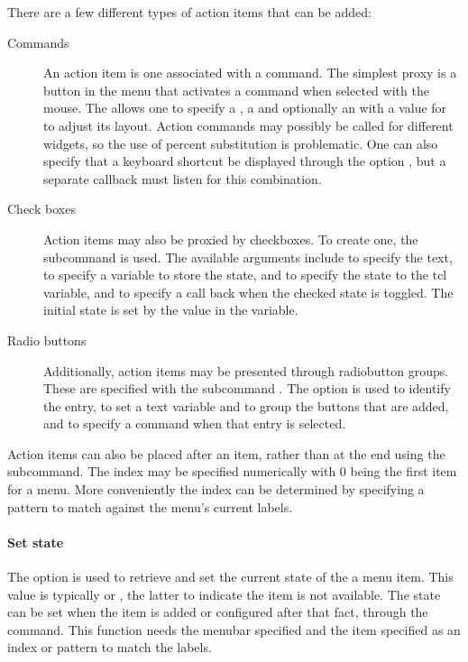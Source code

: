 There are a few different types of action items that can be added:
 
\begin{description}
\item[Commands] An action item is one associated with a command. The
  simplest proxy is a button in the menu that activates a command when
  selected with the mouse. The  allows
  one to specify a , a  and optionally an
   with a value for  to adjust its
  layout. Action commands may %
  possibly be called for different widgets, so the use of percent
  substitution is problematic. One can also specify that a keyboard
  shortcut be displayed through the option , but
  a separate callback must listen for this combination.

\item[Check boxes] Action items may also be proxied by checkboxes. To
  create one, the subcommand  is
  used. The available arguments include  to specify the
  text,  to specify a \TCL{} variable to store the state,
   and  to specify the state to the tcl
  variable, and  to specify a call back when the checked
  state is toggled. The initial state is set by the value in the
  \TCL\/ variable.

\item[Radio buttons] Additionally, action items may be presented
  through radiobutton groups. These are specified with the subcommand
  . The  option is
  used to identify the entry,  to set a text variable
  and to group the buttons that are added, and  to
  specify a command when that entry is selected.
\end{description}

Action items can also be placed after an item, rather than at the end
using the  subcommand. The
index may be specified numerically with 0 being the first item for a
menu.  More conveniently the index can be determined by specifying a
pattern to match against the menu's current labels.


\paragraph{Set state}
The  option is used to retrieve and set the current state
of the a menu item.  This value is typically  or
, the latter to indicate the item is not available. The
state can be set when the item is added or configured after that fact,
through the  command. This function
needs the menubar specified and the item specified as an index or
pattern to match the labels.


